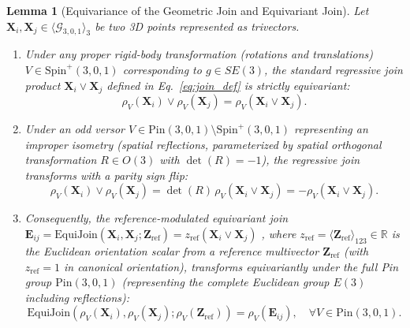 \documentclass[10pt]{article}
\newtheorem{lemma}{Lemma}
\begin{document}
\begin{lemma}[Equivariance of the Geometric Join and Equivariant Join]
\label{lem:join_equivariance}
Let $\mathbf{X}_i, \mathbf{X}_j \in \langle \mathcal{G}_{3,0,1} \rangle_3$ be two 3D points represented as trivectors.
\begin{enumerate}
    \item Under any proper rigid-body transformation (rotations and translations) $V \in \mathrm{Spin}^+(3,0,1)$ corresponding to $g \in SE(3)$, the standard regressive join product $\mathbf{X}_i \vee \mathbf{X}_j$ defined in Eq.~\ref{eq:join_def} is strictly equivariant:
    \begin{equation}
        \rho_V(\mathbf{X}_i) \vee \rho_V(\mathbf{X}_j) = \rho_V(\mathbf{X}_i \vee \mathbf{X}_j).
    \end{equation}
    \item Under an odd versor $V \in \mathrm{Pin}(3,0,1) \setminus \mathrm{Spin}^+(3,0,1)$ representing an improper isometry (spatial reflections, parameterized by spatial orthogonal transformation $R \in O(3)$ with $\det(R) = -1$), the regressive join transforms with a parity sign flip:
    \begin{equation}
        \rho_V(\mathbf{X}_i) \vee \rho_V(\mathbf{X}_j) = \det(R) \, \rho_V(\mathbf{X}_i \vee \mathbf{X}_j) = -\rho_V(\mathbf{X}_i \vee \mathbf{X}_j).
    \end{equation}
    \item Consequently, the reference-modulated equivariant join $\mathbf{E}_{ij} = \mathrm{EquiJoin}(\mathbf{X}_i, \mathbf{X}_j; \mathbf{Z}_{\text{ref}}) = z_{\text{ref}} (\mathbf{X}_i \vee \mathbf{X}_j)$ \citep{gatr}, where $z_{\text{ref}} = \langle \mathbf{Z}_{\text{ref}} \rangle_{123} \in \mathbb{R}$ is the Euclidean orientation scalar from a reference multivector $\mathbf{Z}_{\text{ref}}$ (with $z_{\text{ref}} = 1$ in canonical orientation), transforms equivariantly under the full Pin group $\mathrm{Pin}(3,0,1)$ (representing the complete Euclidean group $E(3)$ including reflections):
    \begin{equation}
        \mathrm{EquiJoin}(\rho_V(\mathbf{X}_i), \rho_V(\mathbf{X}_j); \rho_V(\mathbf{Z}_{\text{ref}})) = \rho_V(\mathbf{E}_{ij}), \quad \forall V \in \mathrm{Pin}(3,0,1).
    \end{equation}
\end{enumerate}
\end{lemma}
\end{document}

